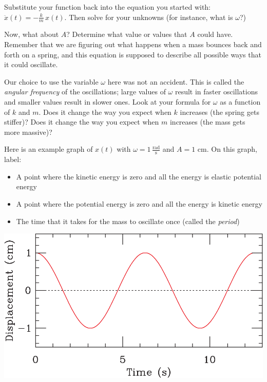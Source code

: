 \documentclass[12pt]{article}
\begin{document}
\vspace{1in}

\newpage

Substitute your function back into the equation you started with: $\ddot x(t) = -\frac{k}{m}\,x(t).$ Then solve for your unknowns (for instance, what is $\omega$?)


\vspace{1in}

Now, what about $A$? Determine what value or values that $A$ could have. Remember that we are figuring out what happens when a mass bounces back and forth on a spring, and this equation is supposed to describe all possible ways that it could oscillate.

\vspace{1in}

Our choice to use the variable $\omega$ here was not an accident. This is called the {\it angular frequency} of the oscillations; large values of $\omega$ result in faster oscillations and smaller values result in slower ones. Look at your formula for $\omega$ as a function of $k$ and $m$. Does it change the way you expect when $k$ increases (the spring gets stiffer)? Does it change the way you expect when $m$ increases (the mass gets more massive)?

\vspace{0.8in}

\begin{minipage}{0.6\textwidth}
Here is an example graph of $x(t)$ with $\omega=1\, \frac{\text{rad}}{\text {s}}$ and $A = 1$ cm. On this graph, label:

\begin{itemize}
\item A point where the kinetic energy is zero and all the energy is elastic potential energy
\item A point where the potential energy is zero and all the energy is kinetic energy
\item The time that it takes for the mass to oscillate once (called the {\it period})
\end{itemize}
\end{minipage}
\begin{minipage}{0.4\textwidth}
\includegraphics [width=\textwidth]{plot11.pdf}
\end{minipage}
\end{document}
